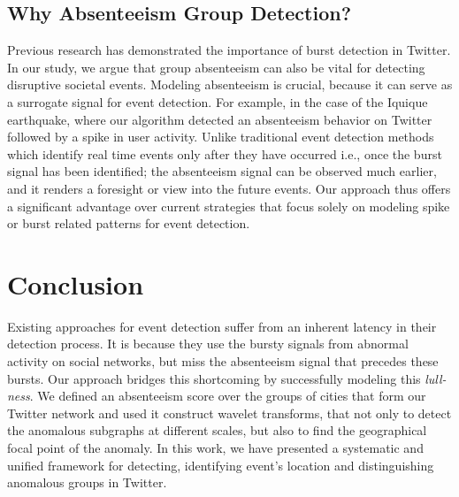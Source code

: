 \documentclass[conference]{IEEEtran}
\begin{document}
\subsection{Why Absenteeism Group Detection?}
Previous research has demonstrated the importance of burst detection in Twitter. In our study, we argue that group absenteeism can also be vital for detecting disruptive societal events. Modeling absenteeism is crucial, because it can serve as a surrogate signal for event detection. For example, in the case of the Iquique earthquake, where our algorithm  detected an absenteeism behavior on Twitter followed by a spike in user activity. Unlike traditional event detection methods which identify real time events only after they have occurred i.e., once the burst signal has been identified; the absenteeism signal can be observed much earlier, and it renders a foresight or view into the future events. Our approach thus offers a significant advantage over current strategies that focus solely on modeling spike or burst related patterns for event detection.


\section{Conclusion}
\label{sec:conclusion}
Existing approaches for event detection suffer from an inherent latency in their detection process. It is because they use the bursty signals from abnormal activity on social networks, but miss the absenteeism signal that precedes these bursts. Our approach bridges this shortcoming by successfully modeling this \textit{lull-ness}. We defined an absenteeism score over the groups of cities that form our Twitter network and used it construct wavelet transforms, that not only to detect the anomalous subgraphs at different scales, but also to find the geographical focal point of the anomaly. In this work, we have presented a systematic and unified framework for detecting, identifying event's location and distinguishing anomalous groups in Twitter. 
\end{document}
